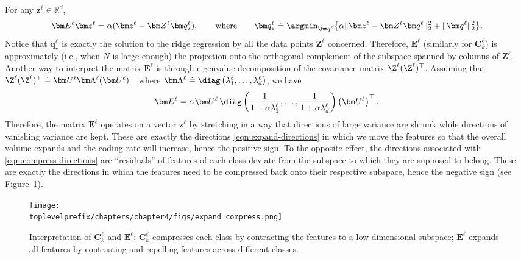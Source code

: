 \documentclass[../../book-main.tex]{subfiles}
\begin{document}
\begin{remark}\label{rem:regression-interpretation} 
For any $\bm z^\ell \in \mathbb{R}^d$,
\begin{gather}
    \bm E^\ell \bm z^\ell = \alpha(\bm z^\ell - \bm Z^\ell \bm q^\ell_\star), \qquad
    \mbox{where} \qquad \bm q^\ell_\star \doteq \argmin_{\bm q^\ell} \big\{\alpha \|\bm z^\ell - \bm Z^\ell \bm q^\ell\|_2^2 + \|\bm q^\ell\|_2^2\big\}.
\end{gather}
Notice that $\bm q^\ell_\star$ is exactly the solution to the ridge regression by all the data points $\bm Z^\ell$ concerned. Therefore, $\bm E^\ell$ (similarly for $\bm C^\ell_k$) is approximately (i.e., when $N$ is large enough) the projection onto the orthogonal complement of the subspace spanned by columns of $\bm Z^\ell$. Another way to interpret the matrix $\bm E^\ell$ is through eigenvalue decomposition of the covariance matrix $\Z^\ell (\Z^\ell)^\top$. Assuming that $\Z^\ell (\Z^\ell)^\top \doteq \bm U^\ell \bm \Lambda^\ell (\bm U^\ell)^\top$ where $\bm \Lambda^\ell \doteq \diag\left(\lambda^\ell_1, \ldots, \lambda^\ell_d \right)$, we have 
\begin{equation}
\bm E^\ell = \alpha \bm U^\ell\, \diag\left(\frac{1}{1+\alpha\lambda^\ell_1}, \ldots, \frac{1}{1+\alpha\lambda^\ell_d}\right) \left(\bm U^\ell\right)^\top.
\end{equation}
Therefore, the matrix $\bm E^\ell$ operates on a vector $\bm z^\ell$ by stretching in a way that directions of large variance are shrunk while directions of vanishing variance are kept. These are exactly the directions \eqref{eqn:expand-directions} in which we move the features so that the overall volume expands and the coding rate will increase, hence the positive sign. To the opposite effect, the directions associated with \eqref{eqn:compress-directions} are ``residuals'' of features of each class deviate from the subspace to which they are supposed to belong. These are exactly the directions in which the features need to be compressed back onto their respective subspace, hence the negative sign (see Figure~\ref{fig:regression-interpretation}). 

\begin{figure}[t]
    \centering
    \texttt{[image: \\toplevelprefix/chapters/chapter4/figs/expand\_compress.png]}
    \caption{\small Interpretation of $\bm C^\ell_k$ and $\bm E^\ell$: $\bm C^\ell_k$ compresses each class by contracting the features to a low-dimensional subspace; $\bm E^\ell$ expands all features by contrasting and repelling features across different classes.}
    \label{fig:regression-interpretation}
    \vspace{-0.1in}
\end{figure}



\end{remark}
\end{document}
